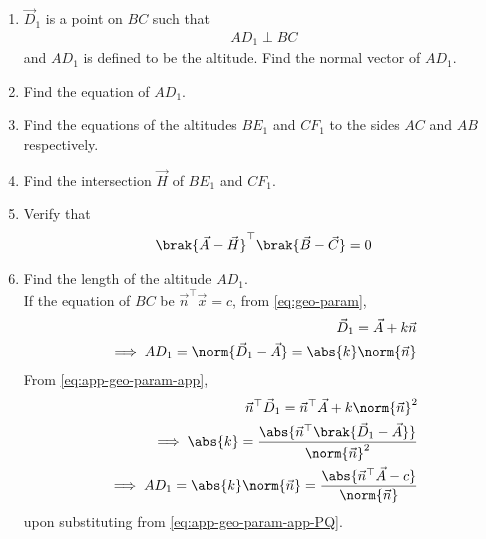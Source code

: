 \begin{enumerate}[label=\thesubsection.\arabic*.,ref=\thesubsection.\theenumi]
\item $\vec{D}_1$ is a point on $BC$ such that
		\begin{align}
			AD_1 \perp BC
		\end{align}
		and $AD_1$ is defined to be the altitude. 
		Find the normal vector of $AD_1$.
  \\
		
	\item Find the equation of $AD_1$.
 \\     

	\item Find the equations of the altitudes $BE_1$ and $CF_1$ to the sides $AC$ and $AB$ respectively. 
  \\     
	\item Find the intersection $\vec{H}$ of $BE_1$ and $CF_1$.
 \\
        
	\item Verify that 
		\begin{align}
			\brak{\vec{A}-\vec{H}}^{\top}\brak{\vec{B}-\vec{C}} = 0
		\end{align}
  
  \item Find the length of the altitude $AD_1$.
	  \\
		\solution 
		If the equation of $BC$ be $\vec{n}^\top\vec{x} =c$,
from
			\eqref{eq:geo-param},
\begin{align}
			\label{eq:app-geo-param-app}
	\vec{D}_1 = \vec{A} + k\vec{n}
	\\
	\implies AD_1 = \norm{\vec{D}_1 - \vec{A}}=\abs{k} \norm{\vec{n}}
			\label{eq:app-geo-param-app-PQ}
\end{align}
			From \eqref{eq:app-geo-param-app},
\begin{align}
	\vec{n}^{\top}  \vec{D}_1 = \vec{n}^{\top}  \vec{A} + k\norm{\vec{n}}^2
	\\
	\implies \abs{k} = 
	\frac{\abs{\vec{n}^{\top}\brak{\vec{D}_1 - \vec{A}}}}{\norm{\vec{n}}^2}
			\label{eq:app-geo-param-app-k}
			\\
	\implies AD_1 =\abs{k}  
		\norm{\vec{n}}	=
	\frac{\abs{\vec{n}^{\top}\vec{A} - c}}{\norm{\vec{n}}}
			\label{eq:app-PQ-final}
\end{align}
upon substituting from 
			\eqref{eq:app-geo-param-app-PQ}.

\end{enumerate}
